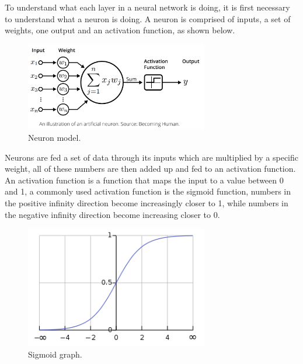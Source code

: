 \documentclass[a4paper,oneside,phd,etd]{BYUPhys}
\begin{document}
To understand what each layer in a neural network is doing, it is first necessary to understand what a neuron is doing. A neuron is comprised of inputs, a set of weights, one output and an activation function\cite{neural-network-intro-book}, as shown below.
\begin{figure}[H]
\centering
\includegraphics[width=8cm]{pictures/neuron_model.png}
\caption{Neuron model\cite{fig:neuron_model}.}
\label{fig:neuron_model}
\end{figure}

Neurons are fed a set of data through its inputs which are multiplied by a specific weight, all of these numbers are then added up and fed to an activation function. An activation function is a function that maps the input to a value between 0 and 1, a commonly used activation function is the sigmoid function, numbers in the positive infinity direction become increasingly closer to 1, while numbers in the negative infinity direction become increasing closer to 0.
\begin{figure}[H]
\centering
\includegraphics[width=8cm]{pictures/sigmoid.png}
\caption{Sigmoid graph\cite{fig:sigmoid}.}
\label{fig:sigmoid}
\end{figure}
\end{document}
